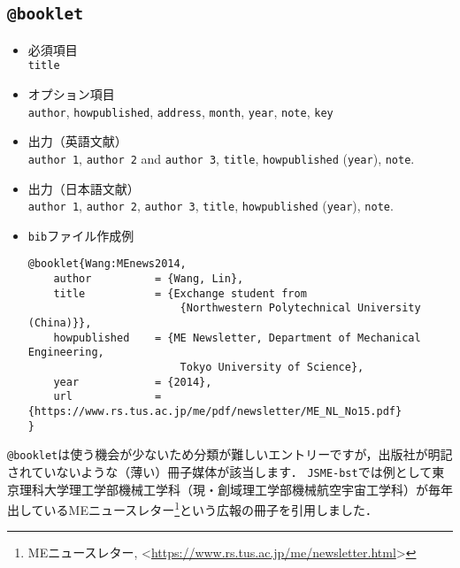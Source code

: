 \documentclass[a4paper,fleqn,uplatex,dvipdfmx]{jsarticle}
\newcommand{\JSMErepos}{\texttt{JSME-bst}}
\begin{document}
\subsection{\texttt{@booklet}}
\label{ssec:booklet}
\begin{screen}
    \begin{itemize}
        \item 必須項目 \\
        \verb|title|
        \item オプション項目 \\
        \verb|author|, \verb|howpublished|, \verb|address|, \verb|month|, \verb|year|, \verb|note|, \verb|key|
        \item 出力（英語文献） \\
            \colorbox[gray]{0.8}{\texttt{author 1}}, \colorbox[gray]{0.8}{\texttt{author 2}} and \colorbox[gray]{0.8}{\texttt{author 3}}, \colorbox[gray]{0.8}{\texttt{title}}, \colorbox[gray]{0.8}{\texttt{howpublished}} (\colorbox[gray]{0.8}{\texttt{year}}), \colorbox[gray]{0.8}{\texttt{note}}.
        \item 出力（日本語文献） \\
            \colorbox[gray]{0.8}{\texttt{author 1}}, \colorbox[gray]{0.8}{\texttt{author 2}}, \colorbox[gray]{0.8}{\texttt{author 3}}, \colorbox[gray]{0.8}{\texttt{title}}, \colorbox[gray]{0.8}{\texttt{howpublished}} (\colorbox[gray]{0.8}{\texttt{year}}), \colorbox[gray]{0.8}{\texttt{note}}.
        \item \verb|bib|ファイル作成例 \vspace{-3mm}
\begin{verbatim}
@booklet{Wang:MEnews2014,
    author          = {Wang, Lin},
    title           = {Exchange student from 
                        {Northwestern Polytechnical University (China)}},
    howpublished    = {ME Newsletter, Department of Mechanical Engineering, 
                        Tokyo University of Science},
    year            = {2014},
    url             = {https://www.rs.tus.ac.jp/me/pdf/newsletter/ME_NL_No15.pdf}
}
\end{verbatim}
    \end{itemize}
\end{screen}

\verb|@booklet|は使う機会が少ないため分類が難しいエントリーですが，出版社が明記されていないような（薄い）冊子媒体が該当します．
\JSMErepos では例として東京理科大学理工学部機械工学科（現・創域理工学部機械航空宇宙工学科）が毎年出しているMEニュースレター\footnote{MEニュースレター, \textless\url{https://www.rs.tus.ac.jp/me/newsletter.html}\textgreater}という広報の冊子を引用しました．
\end{document}
